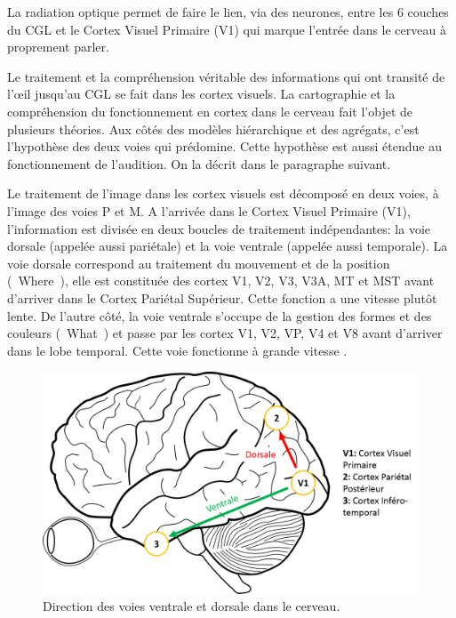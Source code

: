 	\par La radiation optique permet de faire le lien, via des neurones, entre les 6 couches du CGL et le Cortex Visuel Primaire (V1) qui marque l'entrée dans le cerveau à proprement parler.
	
	\par Le traitement et la compréhension véritable des informations qui ont transité de l'œil jusqu'au CGL se fait dans les cortex visuels. La cartographie et la compréhension du fonctionnement en cortex dans le cerveau fait l'objet de plusieurs théories. Aux côtés des modèles hiérarchique et des agrégats, c'est l'hypothèse des deux voies \citep{ingle_two_1982, mishkin_object_1983, goodale_neurological_1991} qui prédomine. Cette hypothèse est aussi étendue au fonctionnement de l'audition. On la décrit dans le paragraphe suivant.
	
	\par Le traitement de l'image dans les cortex visuels est décomposé en deux voies, à l'image des voies P et M. A l'arrivée dans le Cortex Visuel Primaire (V1), l'information est divisée en deux boucles de traitement indépendantes: la voie dorsale (appelée aussi pariétale) et la voie ventrale (appelée aussi temporale). La voie dorsale correspond au traitement du mouvement et de la position (\guillemotleft~Where~\guillemotright), elle est constituée des cortex V1, V2, V3, V3A, MT et MST avant d'arriver dans le Cortex Pariétal Supérieur. Cette fonction a une vitesse plutôt lente. De l'autre côté, la voie ventrale s'occupe de la gestion des formes et des couleurs (\guillemotleft~What~\guillemotright) et passe par les cortex V1, V2, VP, V4 et V8 avant d'arriver dans le lobe temporal. Cette voie fonctionne à grande vitesse \citep{dhondt_emotion_2011, kaiser_dorsal_2010}.
	
	\begin{figure}[h]
		\centering
		\includegraphics[scale=.35]{Figures/VoiesVentraleDorsale}
		\caption{Direction des voies ventrale et dorsale dans le cerveau.}
		\label{fig:voies_ventrale_dorsale}
	\end{figure}
	
